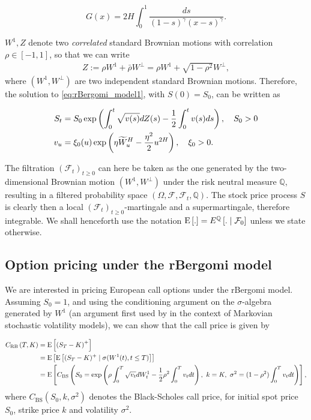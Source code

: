   \begin{equation*}
G(x)=2H \int_{0}^1 \frac{ds}{(1-s)^{\gamma} (x-s)^{\gamma}}.
 \end{equation*}
 

$W^1, Z$ denote two \emph{correlated} standard Brownian motions with correlation $\rho \in [-1,1]$, so that we can write
\begin{align*}
	Z:=\rho	W^1+ \bar{\rho}W^\perp = \rho W^1+\sqrt{1-\rho^2} W^\perp,
\end{align*}
where $(W^1,W^\perp)$ are two independent standard Brownian motions.
Therefore, the solution to \eqref{eq:rBergomi_model1}, with $S(0)=S_0$, can be written as 

\begin{align}\label{eq:rBergomi_model}
	S_t&= S_0  \operatorname{exp}\left( \int_{0}^{t} \sqrt{v(s)} dZ(s)- \frac{1}{2} \int_{0}^{t} v(s) ds   \right),\quad S_0>0 \nonumber\\
	v_u&=\xi_0(u) \operatorname{exp}\left( \eta \widetilde{W}_u^H- \frac{\eta^2}{2} u^{2H} \right), \quad \xi_0>0 .
\end{align}


The filtration $(\mathcal{F}_t)_{t\ge 0}$ can here be taken as the one generated by the two-dimensional Brownian motion $(W^1,W^\perp)$ under the risk neutral measure $\mathbb{Q}$, resulting in  a filtered probability space $(\Omega,\mathcal{F}, \mathcal{F}_t,\mathbb{Q})$. The stock price process $S$ is clearly then a local
$(\mathcal{F}_t)_{t\ge 0}$-martingale and a supermartingale, therefore integrable.  We shall henceforth use the notation $\mathrm{E}\left[.\right] = E^{\mathbb{Q}}\left[. \mid \mathcal{F}_0\right]$ unless we state otherwise.








\subsection{Option pricing under the rBergomi model}\label{sec:Option pricing under rBergomi model}

We are interested in pricing European call options under the rBergomi model. Assuming $S_0 = 1$, and using the conditioning argument on the $\sigma$-algebra generated by $W^1$ (an argument first used by \cite{romano1997contingent} in the context of Markovian stochastic volatility  models), we can  show that the call price is given by

\begin{align}\label{BS_formula_rbergomi}
	C_{\text{RB}}\left( T, K \right) &= \text{E}\left[ \left(S_T - K \right)^+ \right]  \nonumber\\
	&=\mathrm{E}\left[\mathrm{E}\left[(S_T-K)^+ \mid \sigma(W^1(t) ,t \le T)\right]\right]\nonumber \\
	&=\text{E}\left[C_{\text{BS}}\left( S_0 = \operatorname{exp}\left(\rho \int_0^T \sqrt{v_t} dW_t^1 - \frac{1}{2}
	\rho^2 \int_0^T v_t dt\right),\ k = K, \ \sigma^2 = (1-\rho^2)
	\int_0^T v_t dt \right) \right],
\end{align}
where $C_{\text{BS}}(S_0,k,\sigma^2)$ denotes the Black-Scholes call price, for initial spot price $S_0$, strike price $k$ and volatility $\sigma^2$.


